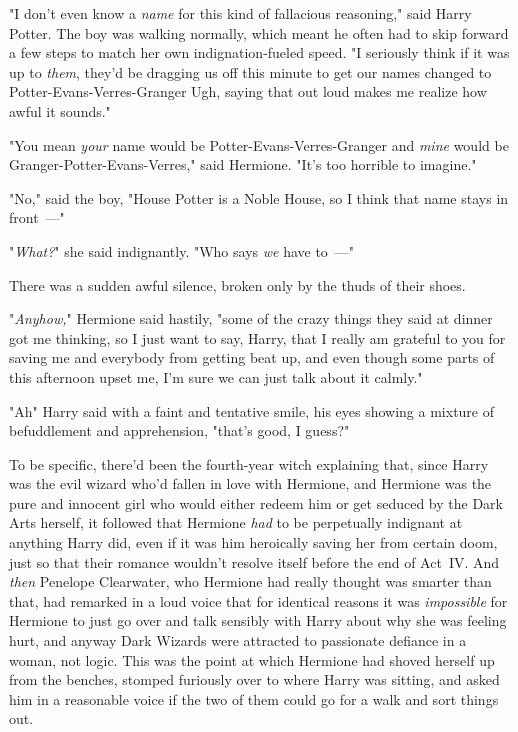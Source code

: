 "I don't even know a \emph{name} for this kind of fallacious reasoning," said
Harry Potter. The boy was walking normally, which meant he often had to skip
forward a few steps to match her own indignation-fueled speed. "I seriously
think if it was up to \emph{them}, they'd be dragging us off this minute to get
our names changed to Potter-Evans-Verres-Granger{\el} Ugh, saying that out
loud makes me realize how awful it sounds."

"You mean \emph{your} name would be Potter-Evans-Verres-Granger and \emph{mine}
would be Granger-Potter-Evans-Verres," said Hermione. "It's too horrible to
imagine."

"No," said the boy, "House Potter is a Noble House, so I think that name stays
in front~---"

"\emph{What?}" she said indignantly. "Who says \emph{we} have to~---"

There was a sudden awful silence, broken only by the thuds of their shoes.

"\emph{Anyhow,}" Hermione said hastily, "some of the crazy things they said at
dinner got me thinking, so I just want to say, Harry, that I really am grateful
to you for saving me and everybody from getting beat up, and even though some
parts of this afternoon upset me, I'm sure we can just talk about it calmly."

"Ah{\el}" Harry said with a faint and tentative smile, his eyes showing a
mixture of befuddlement and apprehension, "that's{\el} good, I guess?"

To be specific, there'd been the fourth-year witch explaining that, since Harry
was the evil wizard who'd fallen in love with Hermione, and Hermione was the
pure and innocent girl who would either redeem him or get seduced by the Dark
Arts herself, it followed that Hermione \emph{had} to be perpetually indignant
at anything Harry did, even if it was him heroically saving her from certain
doom, just so that their romance wouldn't resolve itself before the end of
Act~IV. And \emph{then} Penelope Clearwater, who Hermione had really thought was
smarter than that, had remarked in a loud voice that for identical reasons it
was \emph{impossible} for Hermione to just go over and talk sensibly with Harry
about why she was feeling hurt, and anyway Dark Wizards were attracted to
passionate defiance in a woman, not logic. This was the point at which Hermione
had shoved herself up from the benches, stomped furiously over to where Harry
was sitting, and asked him in a reasonable voice if the two of them could go
for a walk and sort things out.

